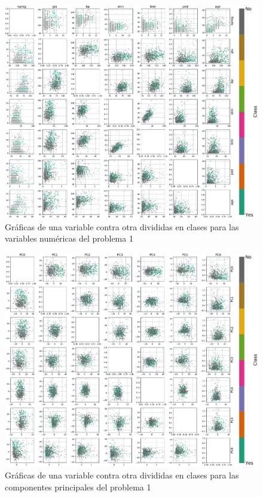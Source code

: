 \documentclass[11pt]{article}
\begin{document}
\begin{figure}[H]
    \centering
    \includegraphics[width = 1.0\textwidth]{1-classes.pdf}
    \caption{Gráficas de una variable contra otra divididas en clases para las variables numéricas del problema 1}
    \label{1-classes}
\end{figure}
\begin{figure}[H]
    \centering
    \includegraphics[width = 1.0\textwidth]{1-pca.pdf}
    \caption{Gráficas de una variable contra otra divididas en clases para las componentes principales del problema 1}
    \label{1-pca}
\end{figure}
\end{document}
